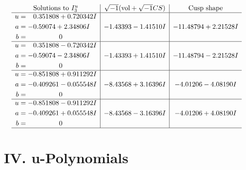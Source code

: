 \documentclass[1p]{elsarticle_modified}
\theoremstyle{definition}
\newcommand{\I}{\sqrt{-1}}
\begin{document}
$$\begin{array}{c|c|c}  
\text{Solutions to }I^u_{3}& \I (\text{vol} + \sqrt{-1}CS) & \text{Cusp shape}\\
 \hline 
\begin{aligned}
u &= \phantom{-}0.351808 + 0.720342 I \\
a &= -0.59074 + 2.34806 I \\
b &= \phantom{-0.000000 } 0\end{aligned}
 & -1.43393 - 1.41510 I & -11.48794 + 2.21528 I \\ \hline\begin{aligned}
u &= \phantom{-}0.351808 - 0.720342 I \\
a &= -0.59074 - 2.34806 I \\
b &= \phantom{-0.000000 } 0\end{aligned}
 & -1.43393 + 1.41510 I & -11.48794 - 2.21528 I \\ \hline\begin{aligned}
u &= -0.851808 + 0.911292 I \\
a &= -0.409261 - 0.055548 I \\
b &= \phantom{-0.000000 } 0\end{aligned}
 & -8.43568 + 3.16396 I & -4.01206 - 4.08190 I \\ \hline\begin{aligned}
u &= -0.851808 - 0.911292 I \\
a &= -0.409261 + 0.055548 I \\
b &= \phantom{-0.000000 } 0\end{aligned}
 & -8.43568 - 3.16396 I & -4.01206 + 4.08190 I\\
 \hline 
 \end{array}$$\newpage
\newpage\renewcommand{\arraystretch}{1}
\centering \section*{ IV. u-Polynomials}
\end{document}

